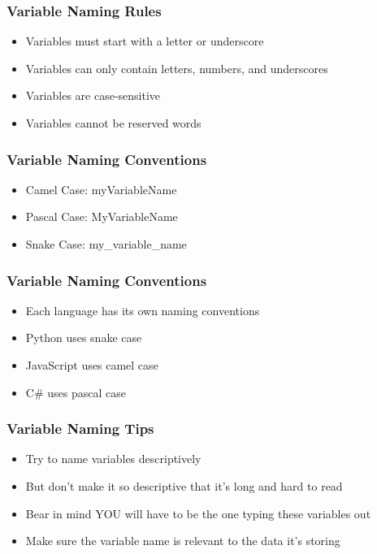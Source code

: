 \documentclass[serif, 9pt, aspectratio=32]{beamer}
\begin{document}
\begin{frame}
    \centering
    \frametitle{Variable Naming Rules}
    \begin{itemize}
        \setlength{\itemsep}{3em}
        \item Variables must start with a letter or underscore
        \item Variables can only contain letters, numbers, and underscores
        \item Variables are case-sensitive
        \item Variables cannot be reserved words
    \end{itemize}
\end{frame}

\begin{frame}
    \centering
    \frametitle{Variable Naming Conventions}
    \begin{itemize}
        \setlength{\itemsep}{3em}
        \item Camel Case: myVariableName
        \item Pascal Case: MyVariableName
        \item Snake Case: my\_variable\_name
    \end{itemize}
\end{frame}

\begin{frame}
    \centering
    \frametitle{Variable Naming Conventions}
    \begin{itemize}
        \setlength{\itemsep}{3em}
        \item Each language has its own naming conventions
        \item Python uses snake case
        \item JavaScript uses camel case
        \item C\# uses pascal case
    \end{itemize}
\end{frame}

\begin{frame}
    \centering
    \frametitle{Variable Naming Tips}
    \begin{itemize}
        \setlength{\itemsep}{3em}
        \item Try to name variables descriptively
        \item But don't make it so descriptive that it's long and hard to read
        \item Bear in mind YOU will have to be the one typing these variables out
        \item Make sure the variable name is relevant to the data it's storing
    \end{itemize}
\end{frame}
\end{document}
